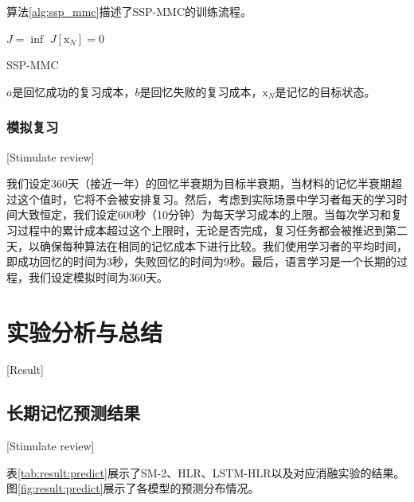 算法\ref{alg:ssp_mmc}描述了SSP-MMC的训练流程。

\begin{algorithm}[htbp]
    $J = \inf$\;
    $J[\bm{\mathrm{x}}_{N}] = 0$\;
\caption{SSP-MMC}
\label{alg:ssp_mmc}
\end{algorithm}

$a$是回忆成功的复习成本，$b$是回忆失败的复习成本，$\bm{\mathrm{x}}_{N}$是记忆的目标状态。

\subsection{模拟复习}[Stimulate review]

我们设定360天（接近一年）的回忆半衰期为目标半衰期，当材料的记忆半衰期超过这个值时，它将不会被安排复习。然后，考虑到实际场景中学习者每天的学习时间大致恒定，我们设定600秒（10分钟）为每天学习成本的上限。当每次学习和复习过程中的累计成本超过这个上限时，无论是否完成，复习任务都会被推迟到第二天，以确保每种算法在相同的记忆成本下进行比较。我们使用学习者的平均时间，即成功回忆的时间为3秒，失败回忆的时间为9秒。最后，语言学习是一个长期的过程，我们设定模拟时间为360天。

\chapter{实验分析与总结}[Result]

\section{长期记忆预测结果}[Stimulate review]

表\ref{tab:result:predict}展示了SM-2、HLR、LSTM-HLR以及对应消融实验的结果。图\ref{fig:result:predict}展示了各模型的预测分布情况。

